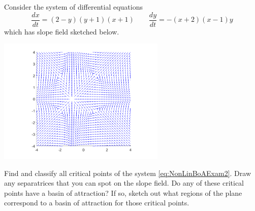 \begin{exercise} 
Consider the system of differential equations
\begin{equation}
\frac{dx}{dt} = (2-y)(y+1)(x+1) \qquad \frac{dy}{dt} = -(x+2)(x-1)y \label{eq:NonLinBoAExam2}
\end{equation}
which has slope field sketched below.
\begin{center}
\includegraphics[width=0.6\textwidth]{Images/NLBoA_Ex2.png}
\end{center}
\begin{tasks}
\task Find and classify all critical points of the system \eqref{eq:NonLinBoAExam2}.
\task Draw any separatrices that you can spot on the slope field.
\task Do any of these critical points have a basin of attraction? If so, sketch out what regions of the plane correspond to a basin of attraction for those critical points. 
\end{tasks}
\end{exercise}

\setcounter{exercise}{100}
